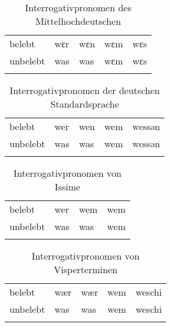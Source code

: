 
\begin{table}[H]
	\caption{Interrogativpronomen des Mittelhochdeutschen \citep[222-223]{Paul2007}}\label{table62}
	\begin{tabular}{lllll}
		\lsptoprule
		& \NOM & \AKK & \DAT & \GEN\\\midrule
 belebt & wɛr & wɛn & wɛm & wɛs\\
		unbelebt & was & was & wɛm & wɛs\\
		\lspbottomrule
	\end{tabular}
\end{table}


\begin{table}[H]
	\caption{Interrogativpronomen der deutschen Standardsprache \citep[169-177]{Eisenberg2006}}\label{table63}
	\begin{tabular}{lllll}
		\lsptoprule
		& \NOM & \AKK & \DAT & \GEN\\\midrule
 belebt & wer & wen & wem & wessən\\
		unbelebt & was & was & wem & wessən\\
		\lspbottomrule
	\end{tabular}
\end{table}


\begin{table}[H]
	\caption{Interrogativpronomen von Issime \citep[258-259, 306]{Zürrer1999}}\label{table64}
	\begin{tabular}{llll}
		\lsptoprule
		& \NOM & \AKK & \DAT\\\midrule
 belebt & wer & wem & wem\\
		unbelebt & was & was & wem\\
		\lspbottomrule
	\end{tabular}
\end{table}


\begin{table}[H]
	\caption{Interrogativpronomen von Visperterminen \citep[143]{Wipf1911}}\label{table65}
	\begin{tabular}{lllll}
		\lsptoprule
		& \NOM & \AKK & \DAT & \GEN\\\midrule
 belebt & wær & wær & wem & weschi\\
		unbelebt & was & was & wem & weschi\\
		\lspbottomrule
	\end{tabular}
\end{table}

